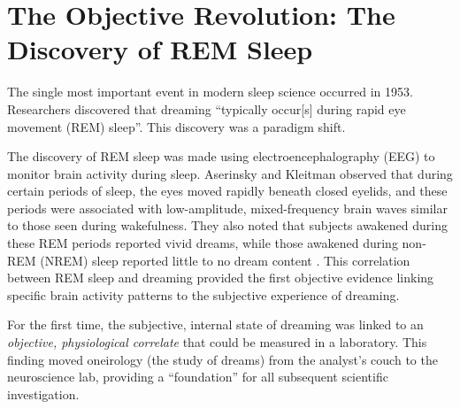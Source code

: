 \section{The Objective Revolution: The Discovery of REM Sleep}\label{sec:rem_revolution}

The single most important event in modern sleep science occurred in 1953. Researchers \citet{aserinsky1953rem} discovered that dreaming ``typically occur[s] during rapid eye movement (REM) sleep''. This discovery was a paradigm shift.

The discovery of REM sleep was made using electroencephalography (EEG) to monitor brain activity during sleep. Aserinsky and Kleitman observed that during certain periods of sleep, the eyes moved rapidly beneath closed eyelids, and these periods were associated with low-amplitude, mixed-frequency brain waves similar to those seen during wakefulness. They also noted that subjects awakened during these REM periods reported vivid dreams, while those awakened during non-REM (NREM) sleep reported little to no dream content \citep{aserinsky1953rem}. This correlation between REM sleep and dreaming provided the first objective evidence linking specific brain activity patterns to the subjective experience of dreaming.

For the first time, the subjective, internal state of dreaming was linked to an \textit{objective, physiological correlate} that could be measured in a laboratory. This finding moved oneirology (the study of dreams) from the analyst's couch to the neuroscience lab, providing a ``foundation'' for all subsequent scientific investigation.